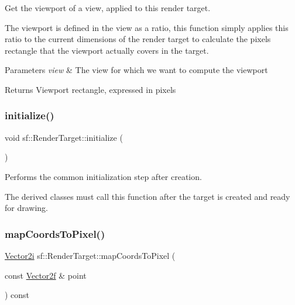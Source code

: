 Get the viewport of a view, applied to this render target. 

The viewport is defined in the view as a ratio, this function simply applies this ratio to the current dimensions of the render target to calculate the pixels rectangle that the viewport actually covers in the target.


\begin{DoxyParams}{Parameters}
{\em view} & The view for which we want to compute the viewport\\
\hline
\end{DoxyParams}
\begin{DoxyReturn}{Returns}
Viewport rectangle, expressed in pixels \begin{DoxyVerb}\end{DoxyVerb}
 
\end{DoxyReturn}
\mbox{\label{classsf_1_1_render_target_af530274b34159d644e509b4b4dc43eb7}} 
\subsubsection{\texorpdfstring{initialize()}{initialize()}}
{\footnotesize\ttfamily void sf\+::\+Render\+Target\+::initialize (\begin{DoxyParamCaption}{ }\end{DoxyParamCaption})\hspace{0.3cm}{\ttfamily [protected]}}



Performs the common initialization step after creation. 

The derived classes must call this function after the target is created and ready for drawing. \begin{DoxyVerb}\end{DoxyVerb}
 \mbox{\label{classsf_1_1_render_target_ad92a9f0283aa5f3f67e473c1105b68cf}} 
\subsubsection{\texorpdfstring{mapCoordsToPixel()}{mapCoordsToPixel()}\hspace{0.1cm}{\footnotesize\ttfamily [1/2]}}
{\footnotesize\ttfamily \mbox{\hyperlink{classsf_1_1_vector2}{Vector2i}} sf\+::\+Render\+Target\+::map\+Coords\+To\+Pixel (\begin{DoxyParamCaption}\item[{const \mbox{\hyperlink{classsf_1_1_vector2}{Vector2f}} \&}]{point }\end{DoxyParamCaption}) const}



